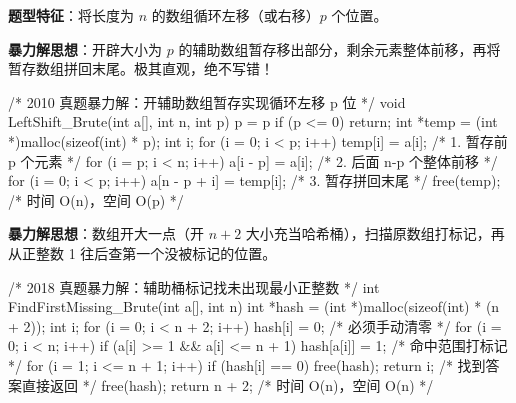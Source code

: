 \documentclass[10pt,a4paper]{ctexart}
\begin{document}

\par\addvspace{3pt}\par\addvspace{3pt}


\textbf{题型特征}：将长度为 $n$ 的数组循环左移（或右移）$p$ 个位置。

\textbf{暴力解思想}：开辟大小为 $p$ 的辅助数组暂存移出部分，剩余元素整体前移，再将暂存数组拼回末尾。极其直观，绝不写错！

\begin{codebox}
/* 2010 真题暴力解：开辅助数组暂存实现循环左移 p 位 */
void LeftShift_Brute(int a[], int n, int p) {
    p = p %
    if (p <= 0) return;
    int *temp = (int *)malloc(sizeof(int) * p);
    int i;
    for (i = 0; i < p; i++) temp[i] = a[i];             /* 1. 暂存前 p 个元素 */
    for (i = p; i < n; i++) a[i - p] = a[i];             /* 2. 后面 n-p 个整体前移 */
    for (i = 0; i < p; i++) a[n - p + i] = temp[i];     /* 3. 暂存拼回末尾 */
    free(temp);                                         /* 时间 O(n)，空间 O(p) */
}
\end{codebox}


\par\addvspace{3pt}\par\addvspace{3pt}


\textbf{暴力解思想}：数组开大一点（开 $n+2$ 大小充当哈希桶），扫描原数组打标记，再从正整数 1 往后查第一个没被标记的位置。

\begin{codebox}
/* 2018 真题暴力解：辅助桶标记找未出现最小正整数 */
int FindFirstMissing_Brute(int a[], int n) {
    int *hash = (int *)malloc(sizeof(int) * (n + 2));
    int i;
    for (i = 0; i < n + 2; i++) hash[i] = 0;            /* 必须手动清零 */
    for (i = 0; i < n; i++) {
        if (a[i] >= 1 && a[i] <= n + 1) hash[a[i]] = 1; /* 命中范围打标记 */
    }
    for (i = 1; i <= n + 1; i++) {
        if (hash[i] == 0) { free(hash); return i; }     /* 找到答案直接返回 */
    }
    free(hash);
    return n + 2;                                       /* 时间 O(n)，空间 O(n) */
}
\end{codebox}
\end{document}
